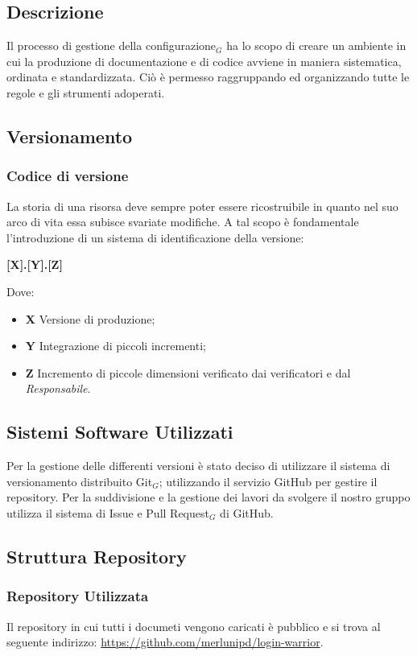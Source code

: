  \subsection{Descrizione}
    Il processo di gestione della configurazione$_G$ ha lo scopo di creare un ambiente in cui la produzione di
    documentazione e di codice avviene in maniera sistematica, ordinata e standardizzata. Ciò è permesso
    raggruppando ed organizzando tutte le regole e gli strumenti adoperati.
 \subsection{Versionamento}
   \subsubsection{Codice di versione}
   La storia di una risorsa deve sempre poter essere ricostruibile in quanto nel suo arco di vita essa subisce
   svariate modifiche. A tal scopo è fondamentale l'introduzione di un sistema di identificazione della
   versione:
   \begin{center}
       \textbf{[X].[Y].[Z]}
   \end{center}
   Dove:
   \begin{itemize}
       \item \textbf{X} Versione di produzione;
       \item \textbf{Y} Integrazione di piccoli incrementi;
       \item \textbf{Z} Incremento di piccole dimensioni verificato dai verificatori e dal \textit{Responsabile}.
   \end{itemize}


 \subsection{Sistemi Software Utilizzati}
 Per la gestione delle differenti versioni è stato deciso di utilizzare il sistema di versionamento distribuito Git$_G$; utilizzando il servizio GitHub per gestire il repository.
 Per la suddivisione e la gestione dei lavori da svolgere il nostro gruppo utilizza il sistema di Issue e Pull Request$_G$ di GitHub.

 \subsection{Struttura Repository}
  \subsubsection{Repository Utilizzata}
  Il repository in cui tutti i documeti vengono caricati è pubblico e si trova al seguente indirizzo:
  \url{https://github.com/merlunipd/login-warrior}.

